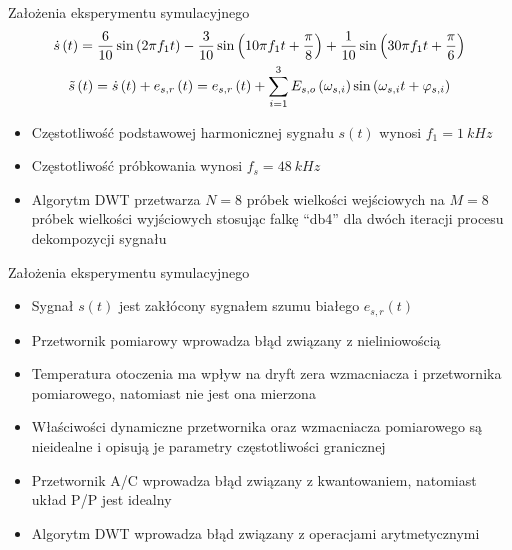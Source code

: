 \documentclass[12pt, polish, aspectratio = 169]{beamer}
\begin{document}
\begin{frame}{Założenia eksperymentu symulacyjnego}
\begin{gather}
\dot{s} \left(t\right) = \frac{6}{10} \sin \left( 2 \pi f_{1} t \right) - \frac{3}{10} \sin \left( 10 \pi f_{1} t + \frac{\pi}{8} \right) + \frac{1}{10} \sin \left( 30 \pi f_{1} t + \frac{\pi}{6} \right) \label{eq:sym_in_ideal} \\
\tilde{s} \left(t\right) = \dot{s} \left(t\right) + e_{s,r} \left(t\right) = e_{s,r} \left(t\right) + \sum _{i=1} ^{3} E_{s,o} \left(\omega_{s,i}\right) \sin \left(\omega_{s,i} t + \varphi_{s,i}\right) \label{eq:sym_in_real}
\end{gather}
\begin{itemize}
\item Częstotliwość podstawowej harmonicznej sygnału $s(t)$ wynosi $f_{1} = \qty{1}{kHz}$
\item Częstotliwość próbkowania wynosi $f_{s} = \qty{48}{kHz}$
\item Algorytm DWT przetwarza $N=8$ próbek wielkości wejściowych na $M=8$ próbek wielkości wyjściowych stosując falkę \enquote{db4} dla dwóch iteracji procesu dekompozycji sygnału
\end{itemize}
\end{frame}

\begin{frame}{Założenia eksperymentu symulacyjnego}
\begin{itemize}
\item Sygnał $s(t)$ jest zakłócony sygnałem szumu białego $e_{s,r}(t)$
\item Przetwornik pomiarowy wprowadza błąd związany z nieliniowością
\item Temperatura otoczenia ma wpływ na dryft zera wzmacniacza i przetwornika pomiarowego, natomiast nie jest ona mierzona
\item Właściwości dynamiczne przetwornika oraz wzmacniacza pomiarowego są nieidealne i opisują je parametry częstotliwości granicznej
\item Przetwornik A/C wprowadza błąd związany z kwantowaniem, natomiast układ P/P jest idealny
\item Algorytm DWT wprowadza błąd związany z operacjami arytmetycznymi
\end{itemize}
\end{frame}
\end{document}
